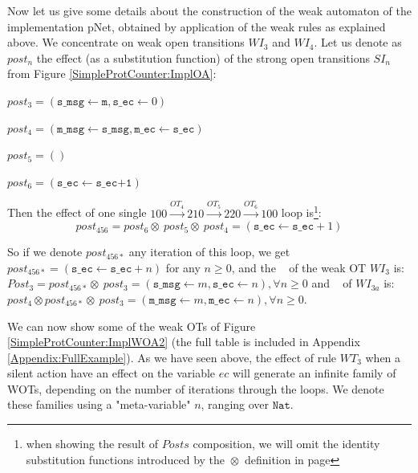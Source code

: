 \documentclass{lmcs}
\newcommand{\TODO}[1]{\textcolor{red}{\textbf{[TODO:#1]}}}
\newcommand{\shortotimes}{\!\otimes\!}
\begin{document}
Now let us give some details about the construction of the weak automaton of the implementation pNet, obtained by application of the weak rules as explained above. We concentrate on weak open transitions $WI_3$ and $WI_4$. Let us denote as $post_n$ the effect (as a substitution function) of the strong open transitions $SI_n$ from Figure \ref{SimpleProtCounter:ImplOA}:
\smallskip

$post_3 = (\texttt{s\_msg}\gets \texttt{m}, \texttt{s\_ec}\gets 0)$

$post_4 = (\texttt{m\_msg}\gets \texttt{s\_msg}, \texttt{m\_ec}\gets \texttt{s\_ec})$

$post_5 = ()$

$post_6 = (\texttt{s\_ec}\gets \texttt{s\_ec+1})$

\medskip

Then the effect of one single $100 \xrightarrow{OT_4} 210 \xrightarrow{OT_5} 220 \xrightarrow{OT_6} 100$ loop is\footnote{when showing  the result of $Posts$ composition, we will omit the identity substitution functions introduced by the $\shortotimes$ definition in page \pageref{def:substitutions}}:
\[post_{456} = post_6 \shortotimes\ post_5 \shortotimes\ post_4
= (\texttt{s\_ec}\gets \texttt{s\_ec}+1)\]

So if we denote ${post_{456*}}$ any iteration of this loop, we get ${post_{456*}} = (\texttt{s\_ec}\gets \texttt{s\_ec}+n)$ for any $n\ge 0$, and the \Post~ of the weak OT  $WI_{3}$ is:\\
 $Post_3 = post_{456*}\shortotimes\ post_3 = (\texttt{s\_msg}\gets m, \texttt{s\_ec}\gets n), \forall n\ge 0$ and \Post~ of  $WI_{3a}$  is:\\ $post_4\shortotimes {post_{456*}}\shortotimes\ post_3 = (\texttt{m\_msg}\gets m, \texttt{m\_ec}\gets n), \forall n\ge 0$.
\medskip

We can now show some of the weak OTs of Figure \ref{SimpleProtCounter:ImplWOA2} (the full table is included in Appendix \ref{Appendix:FullExample}).
As we have seen above, the effect of rule $WT_3$ when a silent action have an effect on the variable $ec$ will generate an infinite family of WOTs, depending on the number of iterations through the loops. We denote these families using a "meta-variable" $n$, ranging over $\texttt{Nat}$.
\smallskip
\end{document}
